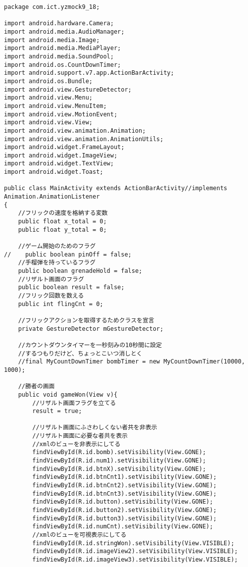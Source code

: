 \documentclass[11pt,a4j]{jarticle}
\begin{document}
	\begin{verbatim}
package com.ict.yzmock9_18;

import android.hardware.Camera;
import android.media.AudioManager;
import android.media.Image;
import android.media.MediaPlayer;
import android.media.SoundPool;
import android.os.CountDownTimer;
import android.support.v7.app.ActionBarActivity;
import android.os.Bundle;
import android.view.GestureDetector;
import android.view.Menu;
import android.view.MenuItem;
import android.view.MotionEvent;
import android.view.View;
import android.view.animation.Animation;
import android.view.animation.AnimationUtils;
import android.widget.FrameLayout;
import android.widget.ImageView;
import android.widget.TextView;
import android.widget.Toast;

public class MainActivity extends ActionBarActivity//implements Animation.AnimationListener
{
    //フリックの速度を格納する変数
    public float x_total = 0;
    public float y_total = 0;

    //ゲーム開始のためのフラグ
//    public boolean pinOff = false;
    //手榴弾を持っているフラグ
    public boolean grenadeHold = false;
    //リザルト画面のフラグ
    public boolean result = false;
    //フリック回数を数える
    public int flingCnt = 0;

    //フリックアクションを取得するためクラスを宣言
    private GestureDetector mGestureDetector;

    //カウントダウンタイマーを一秒刻みの10秒間に設定
    //するつもりだけど、ちょっとこいつ消しとく
    //final MyCountDownTimer bombTimer = new MyCountDownTimer(10000, 1000);

    //勝者の画面
    public void gameWon(View v){
        //リザルト画面フラグを立てる
        result = true;

        //リザルト画面にふさわしくない者共を非表示
        //リザルト画面に必要な者共を表示
        //xmlのビューを非表示にしてる
        findViewById(R.id.bomb).setVisibility(View.GONE);
        findViewById(R.id.num1).setVisibility(View.GONE);
        findViewById(R.id.btnX).setVisibility(View.GONE);
        findViewById(R.id.btnCnt1).setVisibility(View.GONE);
        findViewById(R.id.btnCnt2).setVisibility(View.GONE);
        findViewById(R.id.btnCnt3).setVisibility(View.GONE);
        findViewById(R.id.button).setVisibility(View.GONE);
        findViewById(R.id.button2).setVisibility(View.GONE);
        findViewById(R.id.button3).setVisibility(View.GONE);
        findViewById(R.id.numCnt).setVisibility(View.GONE);
        //xmlのビューを可視表示にしてる
        findViewById(R.id.stringWon).setVisibility(View.VISIBLE);
        findViewById(R.id.imageView2).setVisibility(View.VISIBLE);
        findViewById(R.id.imageView3).setVisibility(View.VISIBLE);


\end{verbatim}
\end{document}
